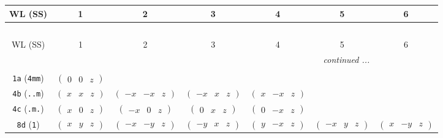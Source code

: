 \documentclass[fleqn,9pt,landscape]{jsarticle}
\begin{document}
\begin{center}
\renewcommand{\arraystretch}{1.2}
\begin{longtable}{ccccccc}
 \hline \hline
WL (SS) & 1 & 2 & 3 & 4 & 5 & 6 \\ \hline \endfirsthead

\multicolumn{6}{l}{\tablename\ \thetable{}} \\
 \hline \hline
WL (SS) & 1 & 2 & 3 & 4 & 5 & 6 \\ \hline \endhead

 \hline \hline
\multicolumn{6}{r}{\footnotesize\it continued ...} \\ \endfoot

 \hline \hline
\multicolumn{6}{r}{} \\ \endlastfoot

{\tt 1a} ({\tt 4mm}) & $ \begin{pmatrix} 0 & 0 & z \end{pmatrix} $ & $  $ & $  $ & $  $ & $  $ & $  $ \\ \hline
{\tt 4b} ({\tt ..m}) & $ \begin{pmatrix} x & x & z \end{pmatrix} $ & $ \begin{pmatrix} - x & - x & z \end{pmatrix} $ & $ \begin{pmatrix} - x & x & z \end{pmatrix} $ & $ \begin{pmatrix} x & - x & z \end{pmatrix} $ & $  $ & $  $ \\ \hline
{\tt 4c} ({\tt .m.}) & $ \begin{pmatrix} x & 0 & z \end{pmatrix} $ & $ \begin{pmatrix} - x & 0 & z \end{pmatrix} $ & $ \begin{pmatrix} 0 & x & z \end{pmatrix} $ & $ \begin{pmatrix} 0 & - x & z \end{pmatrix} $ & $  $ & $  $ \\ \hline
{\tt 8d} ({\tt 1}) & $ \begin{pmatrix} x & y & z \end{pmatrix} $ & $ \begin{pmatrix} - x & - y & z \end{pmatrix} $ & $ \begin{pmatrix} - y & x & z \end{pmatrix} $ & $ \begin{pmatrix} y & - x & z \end{pmatrix} $ & $ \begin{pmatrix} - x & y & z \end{pmatrix} $ & $ \begin{pmatrix} x & - y & z \end{pmatrix} $ \\

\end{longtable}
\end{center}
\end{document}
